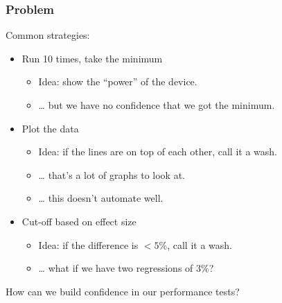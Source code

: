 \documentclass[10pt,aspectratio=169]{beamer}
\begin{document}
\begin{frame}
    \frametitle{Problem}
    
    Common strategies:
    \begin{itemize}
    \item Run 10 times, take the minimum
      \begin{itemize}
      \item Idea: show the ``power'' of the device.
      \item \dots{} but we have no confidence that we got the minimum.
      \end{itemize}
    \item Plot the data
      \begin{itemize}
      \item Idea: if the lines are on top of each other, call it a wash.
      \item \dots{} that's a lot of graphs to look at.
      \item \dots{} this doesn't automate well.
      \end{itemize}
    \item Cut-off based on effect size
      \begin{itemize}
      \item Idea: if the difference is $<5\%$, call it a wash.
      \item \dots{} what if we have two regressions of $3\%$?
      \end{itemize}
    \end{itemize}
    
    \medskip
    \begin{center}
      How can we build confidence in our performance tests?
    \end{center}
    
\end{frame}
\end{document}
